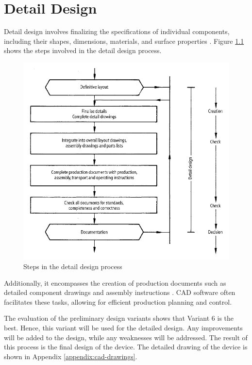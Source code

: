 \chapter{Detail Design}
\label{ch:detail_design}
Detail design involves finalizing the specifications of individual components, including their shapes, dimensions, materials, and surface properties \cite[436]{Pahl2007}. Figure \ref{fig:detail_design_steps} shows the steps involved in the detail design process.

\begin{figure}[!ht]
    \centering
    \includegraphics[width=0.95\linewidth]{texs/Part1/chapter4/image/detaildesignstep.png}
    \caption{Steps in the detail design process}
    \label{fig:detail_design_steps}
\end{figure}

Additionally, it encompasses the creation of production documents such as detailed component drawings and assembly instructions \cite[436]{Pahl2007}. CAD software often facilitates these tasks, allowing for efficient production planning and control.

The evaluation of the preliminary design variants shows that Variant 6 is the best. Hence, this variant will be used for the detailed design. Any improvements will be added to the design, while any weaknesses will be addressed. The result of this process is the final design of the device. The detailed drawing of the device is shown in Appendix \ref{appendix:cad-drawings}.

